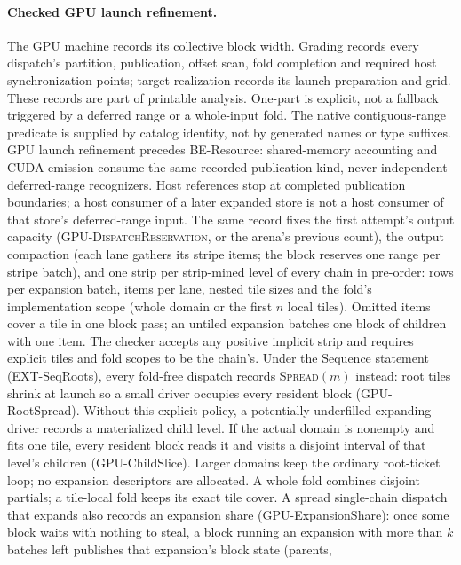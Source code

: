 \paragraph{Checked GPU launch refinement.}
The GPU machine records its collective block width. Grading records every
dispatch's partition, publication, offset scan, fold completion and required
host synchronization points; target realization records its launch preparation
and grid. These records are part of printable analysis. One-part is explicit,
not a fallback triggered by a deferred range or a whole-input fold. The native contiguous-range predicate
is supplied by catalog identity, not by generated names or type suffixes.
GPU launch refinement precedes BE-Resource: shared-memory accounting and CUDA
emission consume the same recorded publication kind, never independent
deferred-range recognizers. Host references stop at completed publication
boundaries; a host consumer of a later expanded store is not a host consumer
of that store's deferred-range input.
The same record fixes the first attempt's output capacity
(\textsc{GPU-DispatchReservation}, or the arena's previous count),
the output compaction (each lane gathers its stripe items; the block reserves
one range per stripe batch), and one strip per strip-mined level of every
chain in pre-order: rows per expansion batch, items per lane, nested tile
sizes and the fold's implementation scope (whole domain or the first $n$
local tiles). Omitted items cover a tile in one block pass; an untiled
expansion batches one block of children with one item. The checker accepts
any positive implicit strip and requires explicit tiles and fold scopes to be
the chain's. Under the Sequence statement  (EXT-SeqRoots),
every fold-free dispatch records \textsc{Spread}$(m)$ instead: root tiles
shrink at launch so a small driver occupies every resident block
(GPU-RootSpread). Without this explicit policy, a potentially underfilled
expanding driver records a materialized child level. If the actual domain is
nonempty and fits one tile, every resident block reads it and visits a disjoint
interval of that level's children (GPU-ChildSlice). Larger domains keep the
ordinary root-ticket loop; no expansion descriptors are allocated. A whole
fold combines disjoint partials; a tile-local fold keeps its exact tile cover.
A spread single-chain dispatch that expands also records an expansion share (GPU-ExpansionShare):
once some block waits with nothing to steal, a block running an expansion with
more than $k$ batches left publishes that expansion's block state (parents,
